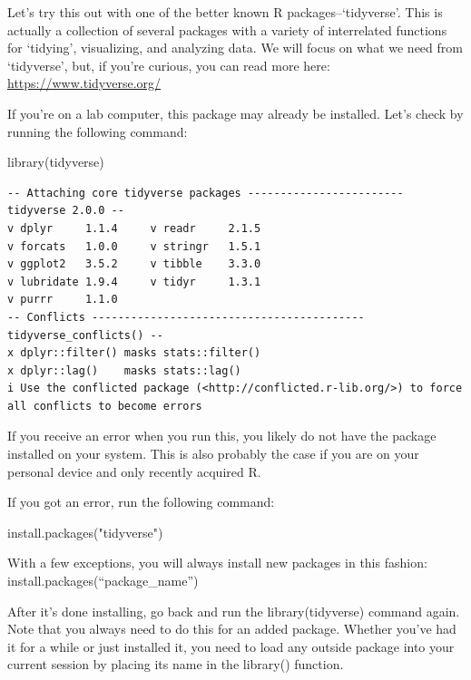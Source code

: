 \documentclass[
  letterpaper,
  DIV=11,
  numbers=noendperiod]{scrreprt}
\newenvironment{Shaded}{\begin{snugshade}}{\end{snugshade}}
\newcommand{\FunctionTok}[1]{\textcolor[rgb]{0.28,0.35,0.67}{#1}}
\newcommand{\NormalTok}[1]{\textcolor[rgb]{0.00,0.23,0.31}{#1}}
\newcommand{\StringTok}[1]{\textcolor[rgb]{0.13,0.47,0.30}{#1}}
\begin{document}
Let's try this out with one of the better known R packages--`tidyverse'.
This is actually a collection of several packages with a variety of
interrelated functions for `tidying', visualizing, and analyzing data.
We will focus on what we need from `tidyverse', but, if you're curious,
you can read more here: \url{https://www.tidyverse.org/}

If you're on a lab computer, this package may already be installed.
Let's check by running the following command:

\begin{Shaded}
\begin{Highlighting}[]
\FunctionTok{library}\NormalTok{(tidyverse)}
\end{Highlighting}
\end{Shaded}

\begin{verbatim}
-- Attaching core tidyverse packages ------------------------ tidyverse 2.0.0 --
v dplyr     1.1.4     v readr     2.1.5
v forcats   1.0.0     v stringr   1.5.1
v ggplot2   3.5.2     v tibble    3.3.0
v lubridate 1.9.4     v tidyr     1.3.1
v purrr     1.1.0     
-- Conflicts ------------------------------------------ tidyverse_conflicts() --
x dplyr::filter() masks stats::filter()
x dplyr::lag()    masks stats::lag()
i Use the conflicted package (<http://conflicted.r-lib.org/>) to force all conflicts to become errors
\end{verbatim}

If you receive an error when you run this, you likely do not have the
package installed on your system. This is also probably the case if you
are on your personal device and only recently acquired R.

If you got an error, run the following command:

\begin{Shaded}
\begin{Highlighting}[]
\FunctionTok{install.packages}\NormalTok{(}\StringTok{"tidyverse"}\NormalTok{)}
\end{Highlighting}
\end{Shaded}

With a few exceptions, you will always install new packages in this
fashion: install.packages(``package\_name'')

After it's done installing, go back and run the library(tidyverse)
command again. Note that you always need to do this for an added
package. Whether you've had it for a while or just installed it, you
need to load any outside package into your current session by placing
its name in the library() function.
\end{document}

